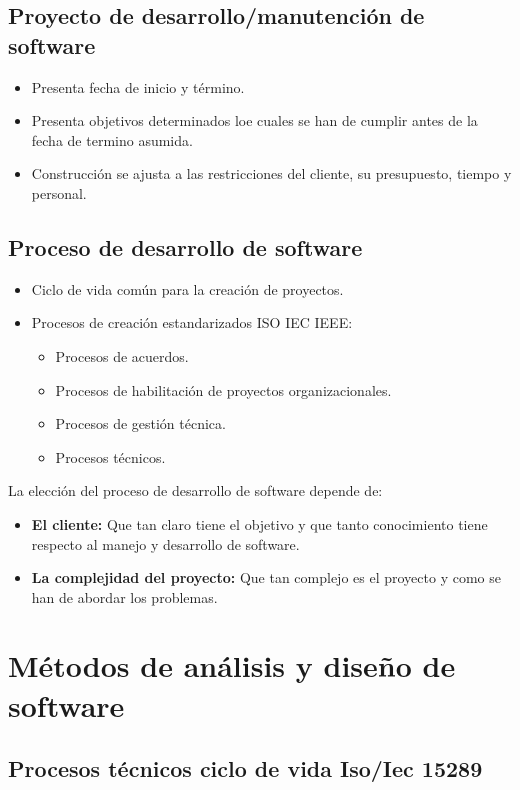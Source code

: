 \documentclass{templateNote}
\begin{document}
\subsection{Proyecto de desarrollo/manutención de software}
\begin{itemize}
    \item Presenta fecha de inicio y término.
    \item Presenta objetivos determinados loe cuales se han de cumplir antes de la fecha de termino asumida.
    \item Construcción se ajusta a las restricciones del cliente, su presupuesto, tiempo y personal.
\end{itemize}

\subsection{Proceso de desarrollo de software}
\begin{itemize}
    \item Ciclo de vida común para la creación de proyectos.
    \item Procesos de creación estandarizados ISO IEC IEEE:
    \begin{itemize}
        \item Procesos de acuerdos.
        \item Procesos de habilitación de proyectos organizacionales.
        \item Procesos de gestión técnica.
        \item Procesos técnicos.
    \end{itemize} 
\end{itemize}
La elección del proceso de desarrollo de software depende de:
\begin{itemize}
    \item \textbf{El cliente:} Que tan claro tiene el objetivo y que tanto conocimiento tiene respecto al manejo y desarrollo de software.
    \item \textbf{La complejidad del proyecto:} Que tan complejo es el proyecto y como se han de abordar los problemas.
\end{itemize}

\section{Métodos de análisis y diseño de software}
\subsection{Procesos técnicos ciclo de vida Iso/Iec 15289}
\end{document}
